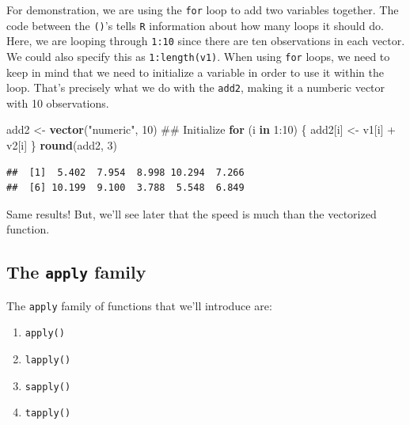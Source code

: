 \documentclass[]{tufte-book}
\newenvironment{Shaded}{}{}
\newcommand{\KeywordTok}[1]{\textcolor[rgb]{0.00,0.44,0.13}{\textbf{#1}}}
\newcommand{\DecValTok}[1]{\textcolor[rgb]{0.25,0.63,0.44}{#1}}
\newcommand{\StringTok}[1]{\textcolor[rgb]{0.25,0.44,0.63}{#1}}
\newcommand{\ControlFlowTok}[1]{\textcolor[rgb]{0.00,0.44,0.13}{\textbf{#1}}}
\newcommand{\OperatorTok}[1]{\textcolor[rgb]{0.40,0.40,0.40}{#1}}
\newcommand{\NormalTok}[1]{#1}
\providecommand{\tightlist}{%
  \setlength{\itemsep}{0pt}\setlength{\parskip}{0pt}}
\theoremstyle{definition}
\theoremstyle{definition}
\theoremstyle{remark}
\begin{document}
For demonstration, we are using the \texttt{for} loop to add two
variables together. The code between the \texttt{()}'s tells \texttt{R}
information about how many loops it should do. Here, we are looping
through \texttt{1:10} since there are ten observations in each vector.
We could also specify this as \texttt{1:length(v1)}. When using
\texttt{for} loops, we need to keep in mind that we need to initialize a
variable in order to use it within the loop. That's precisely what we do
with the \texttt{add2}, making it a numberic vector with 10
observations.

\begin{Shaded}
\begin{Highlighting}[]
\NormalTok{add2 <-}\StringTok{ }\KeywordTok{vector}\NormalTok{(}\StringTok{"numeric"}\NormalTok{, }\DecValTok{10}\NormalTok{)  ## Initialize}
\ControlFlowTok{for}\NormalTok{ (i }\ControlFlowTok{in} \DecValTok{1}\OperatorTok{:}\DecValTok{10}\NormalTok{) \{}
\NormalTok{    add2[i] <-}\StringTok{ }\NormalTok{v1[i] }\OperatorTok{+}\StringTok{ }\NormalTok{v2[i]}
\NormalTok{\}}
\KeywordTok{round}\NormalTok{(add2, }\DecValTok{3}\NormalTok{)}
\end{Highlighting}
\end{Shaded}

\begin{verbatim}
##  [1]  5.402  7.954  8.998 10.294  7.266
##  [6] 10.199  9.100  3.788  5.548  6.849
\end{verbatim}

Same results! But, we'll see later that the speed is much than the
vectorized function.

\subsection*{\texorpdfstring{The \texttt{apply}
family}{The apply family}}\label{the-apply-family}

The \texttt{apply} family of functions that we'll introduce are:

\begin{enumerate}
\def\labelenumi{\arabic{enumi}.}
\tightlist
\item
  \texttt{apply()}
\item
  \texttt{lapply()}
\item
  \texttt{sapply()}
\item
  \texttt{tapply()}
\end{enumerate}
\end{document}
